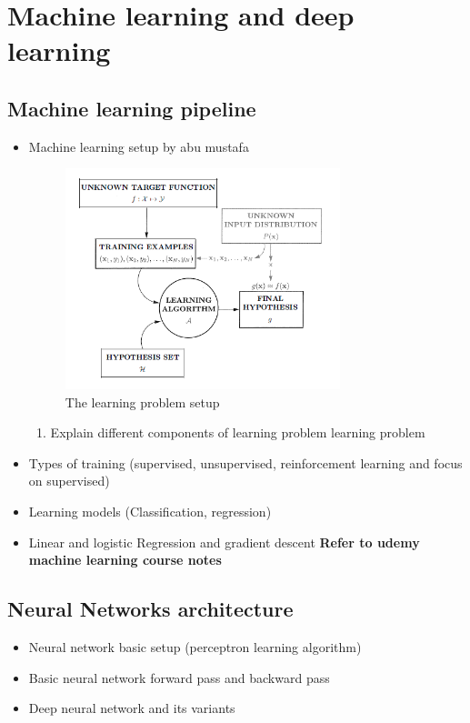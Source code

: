 \section{Machine learning and deep learning}
\subsection{Machine learning pipeline}
    \begin{itemize}
        \item Machine learning setup by abu mustafa 
        \begin{figure}[t]
            \includegraphics[width=8cm]{thesis/figures/Learning problem.PNG}
            \centering
            \caption{The learning problem setup}
            \label{fig:The learning problem setup}
        \end{figure}
        \begin{enumerate}
            \item Explain different components of learning problem  learning problem 
            
        \end{enumerate}
        \item Types of training (supervised, unsupervised, reinforcement learning and focus on supervised)
        \item Learning models (Classification, regression)
        \item Linear and logistic Regression and gradient descent 
        \textbf{Refer to udemy machine learning course notes}
    \end{itemize}
\subsection{Neural Networks architecture}
    \begin{itemize}
        \item Neural network basic setup (perceptron learning algorithm)
        \item Basic neural network forward pass and backward pass
        \item  Deep neural network and its variants
    \end{itemize}

